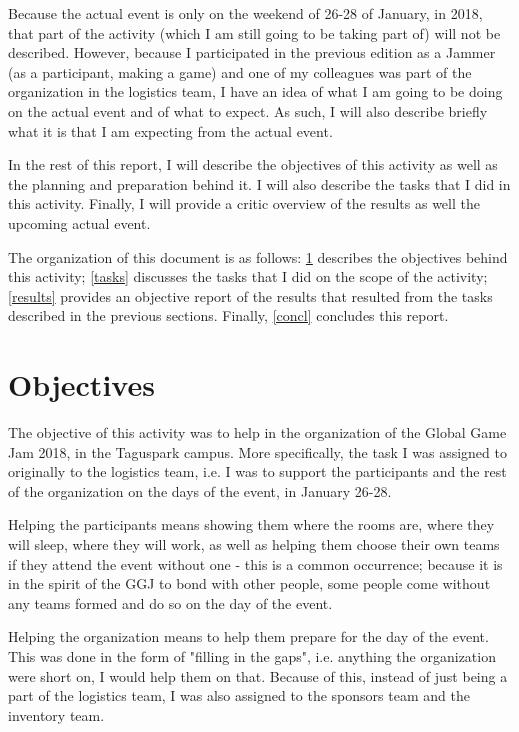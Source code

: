 \documentclass[a4paper,12pt,journal,twoside,compsoc]{PPIEEEtran}
\begin{document}
Because the actual event is only on the weekend of 26-28 of January, in 2018, that part of the activity (which I am still going to be taking part of) will not be described. However, because I participated in the previous edition as a Jammer (as a participant, making a game) and one of my colleagues was part of the organization in the logistics team, I have an idea of what I am going to be doing on the actual event and of what to expect. As such, I will also describe briefly what it is that I am expecting from the actual event.

In the rest of this report, I will describe the objectives of this activity as well as the planning and preparation behind it. I will also describe the tasks that I did in this activity. Finally, I will provide a critic overview of the results as well the upcoming actual event.

The organization of this document is as follows: \cref{objectives} describes the objectives behind this activity; \cref{tasks} discusses the tasks that I did on the scope of the activity; \cref{results} provides an objective report of the results that resulted from the tasks described in the previous sections. Finally, \cref{concl} concludes this report.

\section{Objectives}
\label{objectives}

The objective of this activity was to help in the organization of the Global Game Jam 2018, in the Taguspark campus. More specifically, the task I was assigned to originally to the logistics team, i.e. I was to support the participants and the rest of the organization on the days of the event, in January 26-28. 

Helping the participants means showing them where the rooms are, where they will sleep, where they will work, as well as helping them choose their own teams if they attend the event without one - this is a common occurrence; because it is in the spirit of the GGJ to bond with other people, some people come without any teams formed and do so on the day of the event.

Helping the organization means to help them prepare for the day of the event. This was done in the form of "filling in the gaps", i.e. anything the organization were short on, I would help them on that. Because of this, instead of just being a part of the logistics team, I was also assigned to the sponsors team and the inventory team.
\end{document}
